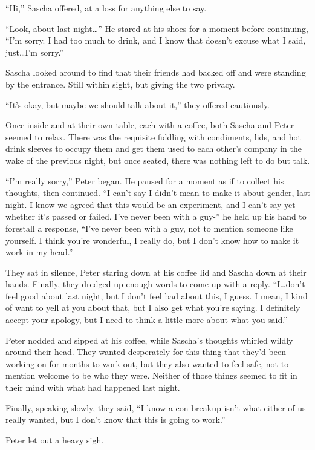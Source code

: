 ``Hi,'' Sascha offered, at a loss for anything else to say.

``Look, about last night\ldots{}'' He stared at his shoes for a moment before continuing, ``I'm sorry. I had too much to drink, and I know that doesn't excuse what I said, just\ldots{}I'm sorry.''

Sascha looked around to find that their friends had backed off and were standing by the entrance. Still within sight, but giving the two privacy.

``It's okay, but maybe we should talk about it,'' they offered cautiously.

Once inside and at their own table, each with a coffee, both Sascha and Peter seemed to relax. There was the requisite fiddling with condiments, lids, and hot drink sleeves to occupy them and get them used to each other's company in the wake of the previous night, but once seated, there was nothing left to do but talk.

``I'm really sorry,'' Peter began. He paused for a moment as if to collect his thoughts, then continued. ``I can't say I didn't mean to make it about gender, last night. I know we agreed that this would be an experiment, and I can't say yet whether it's passed or failed. I've never been with a guy-'' he held up his hand to forestall a response, ``I've never been with a guy, not to mention someone like yourself. I think you're wonderful, I really do, but I don't know how to make it work in my head.''

They sat in silence, Peter staring down at his coffee lid and Sascha down at their hands. Finally, they dredged up enough words to come up with a reply. ``I\ldots{}don't feel good about last night, but I don't feel bad about this, I guess. I mean, I kind of want to yell at you about that, but I also get what you're saying. I definitely accept your apology, but I need to think a little more about what you said.''

Peter nodded and sipped at his coffee, while Sascha's thoughts whirled wildly around their head. They wanted desperately for this thing that they'd been working on for months to work out, but they also wanted to feel safe, not to mention welcome to be who they were. Neither of those things seemed to fit in their mind with what had happened last night.

Finally, speaking slowly, they said, ``I know a con breakup isn't what either of us really wanted, but I don't know that this is going to work.''

Peter let out a heavy sigh.

